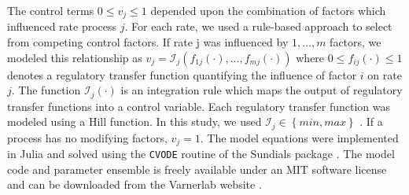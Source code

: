 \documentclass[12pt]{article}
\begin{document}
The control terms $0\leq v_{j}\leq 1$ depended upon the combination of factors which influenced rate process $j$.
For each rate, we used a rule-based approach to select from competing control factors.
If rate j was influenced by $1,\dots,m$ factors, we modeled this relationship as
$v_{j}=\mathcal{I}_{j}\left(f_{1j}\left(\cdot\right),\hdots,f_{mj}\left(\cdot\right)\right)$
where $0\leq f_{ij}\left(\cdot\right)\leq 1$ denotes a regulatory transfer function quantifying the influence of factor $i$ on rate $j$.
The function $\mathcal{I}_{j}\left(\cdot\right)$ is an integration rule which maps the output of regulatory transfer functions into a control
variable. Each regulatory transfer function was modeled using a Hill function.
In this study, we used $\mathcal{I}_{j}\in\left\{min,max\right\}$ \cite{pr3010178}. If a process has no modifying factors, $v_{j}=1$.
The model equations were implemented in Julia and solved using the \texttt{CVODE} routine of the Sundials package \cite{Julia,Sundials}.
The model code and parameter ensemble is freely available under an MIT software license and can be downloaded from the Varnerlab website \cite{Varnerlab}.
\end{document}
